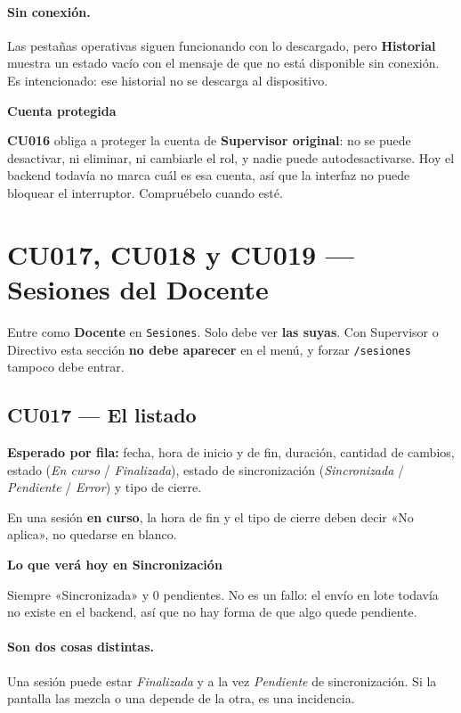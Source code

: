 \documentclass[11pt,a4paper]{article}
\newcommand{\ruta}[1]{\textcolor{azulmarino}{\texttt{#1}}}
\newcommand{\cu}[1]{\textbf{CU#1}}
\newenvironment{aviso}[1]
  {\par\medskip\noindent
   \begin{lrbox}{\cajaaviso}
   \begin{minipage}{\dimexpr\textwidth-2\fboxsep-2\fboxrule\relax}
   \smallskip
   \textbf{\textcolor{ambar}{#1}}\par\smallskip}
  {\smallskip\end{minipage}\end{lrbox}%
   \fcolorbox{ambar}{grisclaro}{\usebox{\cajaaviso}}\par\medskip}
\begin{document}
\paragraph{Sin conexión.} Las pestañas operativas siguen funcionando con lo
descargado, pero \textbf{Historial} muestra un estado vacío con el mensaje de
que no está disponible sin conexión. Es intencionado: ese historial no se
descarga al dispositivo.

\begin{aviso}{Cuenta protegida}
\cu{016} obliga a proteger la cuenta de \textbf{Supervisor original}: no se
puede desactivar, ni eliminar, ni cambiarle el rol, y nadie puede
auto\-desactivarse. Hoy el backend todavía no marca cuál es esa cuenta, así que
la interfaz no puede bloquear el interruptor. Compruébelo cuando esté.
\end{aviso}

\newpage
\section{CU017, CU018 y CU019 --- Sesiones del Docente}

Entre como \textbf{Docente} en \ruta{Sesiones}. Solo debe ver \textbf{las
suyas}. Con Supervisor o Directivo esta sección \textbf{no debe aparecer} en el
menú, y forzar \ruta{/sesiones} tampoco debe entrar.

\subsection{CU017 --- El listado}

\textbf{Esperado por fila:} fecha, hora de inicio y de fin, duración, cantidad
de cambios, estado (\emph{En curso} / \emph{Finalizada}), estado de
sincronización (\emph{Sincronizada} / \emph{Pendiente} / \emph{Error}) y tipo
de cierre.

En una sesión \textbf{en curso}, la hora de fin y el tipo de cierre deben
decir «No aplica», no quedarse en blanco.

\begin{aviso}{Lo que verá hoy en Sincronización}
Siempre «Sincronizada» y 0 pendientes. No es un fallo: el envío en lote todavía
no existe en el backend, así que no hay forma de que algo quede pendiente.
\end{aviso}

\paragraph{Son dos cosas distintas.} Una sesión puede estar \emph{Finalizada} y
a la vez \emph{Pendiente} de sincronización. Si la pantalla las mezcla o una
depende de la otra, es una incidencia.
\end{document}
